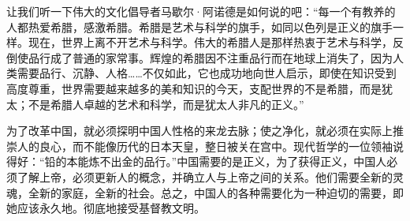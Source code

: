 \documentclass[12pt,oneside]{book}
\begin{document}
\begin{common-format}
让我们听一下伟大的文化倡导者马歇尔·阿诺德是如何说的吧：“每一个有教养的人都热爱希腊，感激希腊。希腊是艺术与科学的旗手，如同以色列是正义的旗手一样。现在，世界上离不开艺术与科学。伟大的希腊人是那样热衷于艺术与科学，反倒使品行成了普通的家常事。辉煌的希腊因不注重品行而在地球上消失了，因为人类需要品行、沉静、人格……不仅如此，它也成功地向世人启示，即使在知识受到高度尊重，世界需要越来越多的美和知识的今天，支配世界的不是希腊，而是犹太；不是希腊人卓越的艺术和科学，而是犹太人非凡的正义。” 

为了改革中国，就必须探明中国人性格的来龙去脉；使之净化，就必须在实际上推崇人的良心，而不能像历代的日本天皇，整日被关在宫中。现代哲学的一位领袖说得好：“铅的本能炼不出金的品行。”中国需要的是正义，为了获得正义，中国人必须了解上帝，必须更新人的概念，并确立人与上帝之间的关系。他们需要全新的灵魂，全新的家庭，全新的社会。总之，中国人的各种需要化为一种迫切的需要，即她应该永久地。彻底地接受基督教文明。 






\end{common-format}
\end{document}
